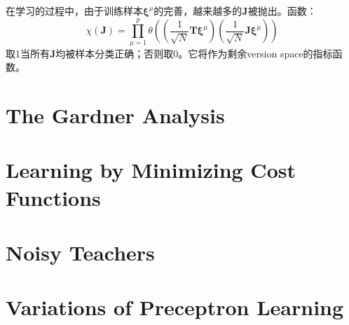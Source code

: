 \documentclass[11pt,fleqn, UTF8]{ctexbook} %
\begin{document}
\begin{subappendices}
在学习的过程中，由于训练样本$\boldsymbol{\xi}^{\mu}$的完善，越来越多的$\boldsymbol{J}$被抛出。函数：
\begin{equation}\label{appa15}
  \chi(\boldsymbol{J})=\prod_{\mu=1}^p\theta((\frac{1}{\sqrt{N}}\boldsymbol{T}\boldsymbol{\xi}^{\mu})(\frac{1}{\sqrt{N}}\boldsymbol{J}\boldsymbol{\xi}^{\mu}))
\end{equation}
取1当所有$\boldsymbol{J}$均被样本分类正确；否则取0。它将作为剩余version space的指标函数。


\section{The Gardner Analysis}
\section{Learning by Minimizing Cost Functions}
\section{Noisy Teachers}
\section{Variations of Preceptron Learning}
\end{subappendices}
\end{document}
